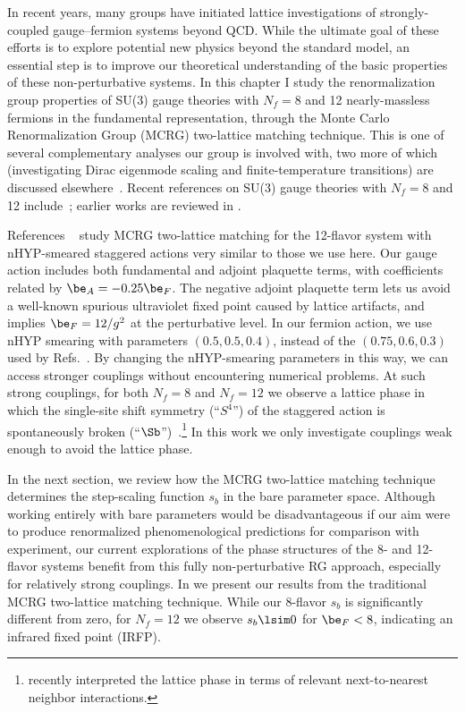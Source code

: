 
In recent years, many groups have initiated lattice investigations of strongly-coupled gauge--fermion systems beyond QCD.
While the ultimate goal of these efforts is to explore potential new physics beyond the standard model, an essential step is to improve our theoretical understanding of the basic properties of these non-perturbative systems.
In this chapter I study the renormalization group properties of SU(3) gauge theories with $N_f = 8$ and 12 nearly-massless fermions in the fundamental representation, through the Monte Carlo Renormalization Group (MCRG) two-lattice matching technique.
This is one of several complementary analyses our group is involved with, two more of which (investigating Dirac eigenmode scaling and finite-temperature transitions) are discussed elsewhere~\cite{Hasenfratz:2012fp, Schaich:2012fr}.
Recent references on SU(3) gauge theories with $N_f = 8$ and 12 include~\cite{Fodor:2012uw, Fodor:2012et, Aoki:2012eq, Deuzeman:2012ee, Lin:2012iw}; earlier works are reviewed in .

References ~\cite{Hasenfratz:2011xn, Hasenfratz:2011np} study MCRG two-lattice matching for the 12-flavor system with nHYP-smeared staggered actions very similar to those we use here.
Our gauge action includes both fundamental and adjoint plaquette terms, with coefficients related by $\be_A = -0.25\be_F$.
The negative adjoint plaquette term lets us avoid a well-known spurious ultraviolet fixed point caused by lattice artifacts, and implies $\be_F = 12 / g^2$ at the perturbative level.
In our fermion action, we use nHYP smearing with parameters $(0.5, 0.5, 0.4)$, instead of the $(0.75, 0.6, 0.3)$ used by Refs.~\cite{Hasenfratz:2011xn, Hasenfratz:2011np}.
By changing the nHYP-smearing parameters in this way, we can access stronger couplings without encountering numerical problems.
At such strong couplings, for both $N_f = 8$ and $N_f = 12$ we observe a lattice phase in which the single-site shift symmetry (``$S^4$'') of the staggered action is spontaneously broken (``$\Sb$'')~\cite{Cheng:2011ic, Schaich:2012fr}.\footnote{ recently interpreted the \Sb lattice phase in terms of relevant next-to-nearest neighbor interactions.}
In this work we only investigate couplings weak enough to avoid the \Sb lattice phase.

In the next section, we review how the MCRG two-lattice matching technique determines the step-scaling function $s_b$ in the bare parameter space.
Although working entirely with bare parameters would be disadvantageous if our aim were to produce renormalized phenomenological predictions for comparison with experiment, our current explorations of the phase structures of the 8- and 12-flavor systems benefit from this fully non-perturbative RG approach, especially for relatively strong couplings.
In  we present our results from the traditional MCRG two-lattice matching technique.
While our 8-flavor $s_b$ is significantly different from zero, for $N_f = 12$ we observe $s_b \lsim 0$ for $\be_F < 8$, indicating an infrared fixed point (IRFP).

